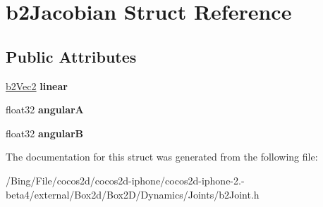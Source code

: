 \hypertarget{structb2_jacobian}{\section{b2\-Jacobian Struct Reference}
\label{structb2_jacobian}
}
\subsection*{Public Attributes}
\begin{DoxyCompactItemize}
\item 
\hypertarget{structb2_jacobian_aa63199b443d411972b9cb6aac6c7cb34}{\hyperlink{structb2_vec2}{b2\-Vec2} {\bfseries linear}}\label{structb2_jacobian_aa63199b443d411972b9cb6aac6c7cb34}

\item 
\hypertarget{structb2_jacobian_a0669f849afcdc154b36f86cb0529d2bc}{float32 {\bfseries angular\-A}}\label{structb2_jacobian_a0669f849afcdc154b36f86cb0529d2bc}

\item 
\hypertarget{structb2_jacobian_a3bbdbd8e46f4fa9be2e50434edaaeb14}{float32 {\bfseries angular\-B}}\label{structb2_jacobian_a3bbdbd8e46f4fa9be2e50434edaaeb14}

\end{DoxyCompactItemize}


The documentation for this struct was generated from the following file\-:\begin{DoxyCompactItemize}
\item 
/\-Bing/\-File/cocos2d/cocos2d-\/iphone/cocos2d-\/iphone-\/2.-\/beta4/external/\-Box2d/\-Box2\-D/\-Dynamics/\-Joints/b2\-Joint.\-h\end{DoxyCompactItemize}
